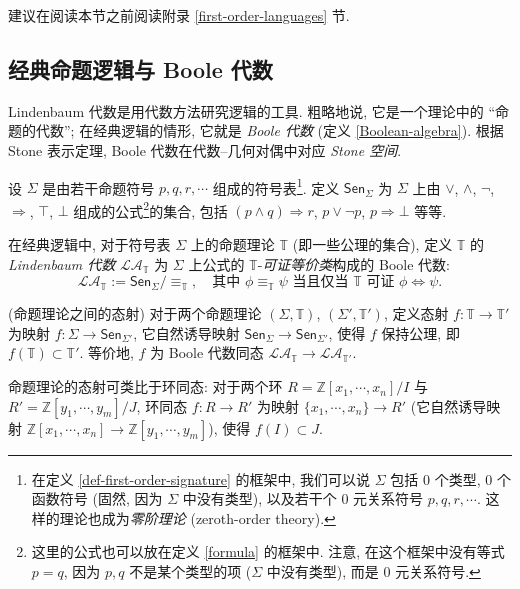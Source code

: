 建议在阅读本节之前阅读附录 \ref{first-order-languages} 节.


\subsection{经典命题逻辑与 Boole 代数}

Lindenbaum 代数是用代数方法研究逻辑的工具. 粗略地说, 它是一个理论中的 ``命题的代数''; 在经典逻辑的情形, 它就是 \emph{Boole 代数} (定义 \ref{Boolean-algebra}). 根据 Stone 表示定理, Boole 代数在代数--几何对偶中对应 \emph{Stone 空间}.

设 $\Sigma$ 是由若干命题符号 $p,q,r,\cdots$ 组成的符号表\footnote{在定义 \ref{def-first-order-signature} 的框架中, 我们可以说 $\Sigma$ 包括 $0$ 个类型, $0$ 个函数符号 (固然, 因为 $\Sigma$ 中没有类型), 以及若干个 $0$ 元关系符号 $p,q,r,\cdots$. 这样的理论也成为\emph{零阶理论} (zeroth-order theory).}.
定义 $\mathsf {Sen}_\Sigma$ 为 $\Sigma$ 上由 $\lor$, $\land$, $\neg$, $\Rightarrow$, $\top$, $\bot$ 组成的公式\footnote{这里的公式也可以放在定义 \ref{formula} 的框架中. 注意, 在这个框架中没有等式 $p=q$, 因为 $p,q$ 不是某个类型的项 ($\Sigma$ 中没有类型), 而是 $0$ 元关系符号.}的集合, 包括 $(p\land q)\Rightarrow r$, $p\lor\neg p$, $p\Rightarrow\bot$ 等等.

\newcommand{\LA}{\mathcal {LA}}

\begin{definition}
	{}
	在经典逻辑中, 对于符号表 $\Sigma$ 上的命题理论 $\mathbb T$ (即一些公理的集合), 定义 $\mathbb T$ 的 \emph{Lindenbaum 代数} $\LA_{\mathbb T}$ 为 $\Sigma$ 上公式的 $\mathbb T$-\emph{可证等价类}构成的 Boole 代数:
	$$
	\LA_{\mathbb T} := \mathsf {Sen}_\Sigma \big/ {\equiv_{\mathbb T}},\quad
	\text{其中 $\phi\equiv_{\mathbb T} \psi$ 当且仅当 $\mathbb T$ 可证 $\phi\Leftrightarrow\psi$}.
	$$
\end{definition}

\begin{definition}
	{(命题理论之间的态射)}
	对于两个命题理论 $(\Sigma,\mathbb T)$, $(\Sigma',\mathbb T')$, 定义态射 $f\colon \mathbb T \to \mathbb T'$ 为映射 $f\colon \Sigma \to \mathsf {Sen}_{\Sigma'}$, 它自然诱导映射 $\mathsf {Sen}_\Sigma\to \mathsf {Sen}_{\Sigma'}$, 使得 $f$ 保持公理, 即 $f(\mathbb T)\subset \mathbb T'$. 等价地, $f$ 为 Boole 代数同态 $\LA_{\mathbb T} \to \LA_{\mathbb T'}$.
\end{definition}

\begin{remark}
	{}
	命题理论的态射可类比于环同态: 对于两个环 $R=\mathbb{Z}[x_1,\cdots,x_n]/I$ 与 $R'=\mathbb{Z}[y_1,\cdots,y_m]/J$, 环同态 $f\colon R\to R'$ 为映射 $\{x_1,\cdots,x_n\}\to R'$ (它自然诱导映射 $\mathbb{Z}[x_1,\cdots,x_n]\to \mathbb{Z}[y_1,\cdots,y_m]$), 使得 $f(I)\subset J$.
\end{remark}


